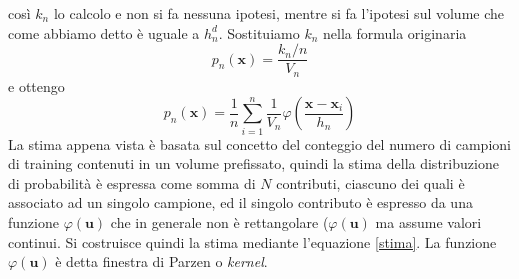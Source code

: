 così $k_n$ lo calcolo e non si fa nessuna ipotesi, mentre si fa l'ipotesi sul volume che come abbiamo detto è uguale a $h_n^d$. Sostituiamo $k_n$ nella formula originaria
\begin{equation}
p_n(\mathbf{x}) = \frac{k_n/n}{V_n}
\end{equation}
e ottengo
\begin{equation}\label{stima}
p_n(\mathbf{x}) = \frac{1}{n} \sum_{i=1}^n \frac{1}{V_n}\varphi \left ( \frac{\mathbf{x} - \mathbf{x}_i}{h_n} \right )
\end{equation}
La stima appena vista è basata sul concetto del conteggio del numero di campioni di training contenuti in un volume prefissato, quindi la stima della distribuzione di probabilità è espressa come somma di $N$ contributi, ciascuno dei quali è associato ad un singolo campione, ed il singolo contributo è espresso da una funzione $\varphi(\mathbf{u})$ che in generale non è rettangolare ($\varphi(\mathbf{u})$ ma assume valori continui. Si costruisce quindi la stima mediante l'equazione \ref{stima}. La funzione  $\varphi(\mathbf{u})$ è detta finestra di Parzen o \emph{kernel}.\\

